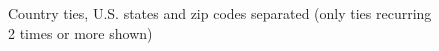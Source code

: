 \documentclass[a4paper]{article}
\begin{document}
\clearpage

\begin{figure}[p]
\caption{Country ties, U.S. states and zip codes separated (only ties recurring 2 times or more shown)}
\end{figure}

\clearpage
\end{document}
